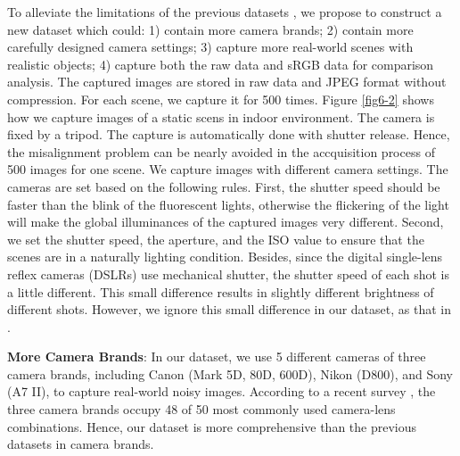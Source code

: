 To alleviate the limitations of the previous datasets \cite{RENOIR2014,crosschannel2016,dnd2017}, we propose to construct a new dataset which could: 1) contain more camera brands; 2) contain more carefully designed camera settings; 3) capture more real-world scenes with realistic objects; 4) capture both the raw data and sRGB data for comparison analysis. The captured images are stored in raw data and JPEG format without compression. For each scene, we capture it for 500 times. Figure \ref{fig6-2} shows how we capture images of a static scens in indoor environment. The camera is fixed by a tripod. The capture is automatically done with shutter release. Hence, the misalignment problem can be nearly avoided in the accquisition process of 500 images for one scene. We capture images with different camera settings. The cameras are set based on the following rules. First, the shutter speed should be faster than the blink of the fluorescent lights, otherwise the flickering of the light will make the global illuminances of the captured images very different. Second, we set the shutter speed, the aperture, and the ISO value to ensure that the scenes are in a naturally lighting condition. Besides, since the digital single-lens reflex cameras (DSLRs) use mechanical shutter, the shutter speed of each shot is a little different. This small difference results in slightly different brightness of different shots. However, we ignore this small difference in our dataset, as that in \cite{crosschannel2016}.


\textbf{More Camera Brands}: In our dataset, we use 5 different cameras of three camera brands, including Canon (Mark 5D, 80D, 600D), Nikon (D800), and Sony (A7 II), to capture real-world noisy images. According to a recent survey \cite{commoncamera}, the three camera brands occupy 48 of 50 most commonly used camera-lens combinations. Hence, our dataset is more comprehensive than the previous datasets in camera brands.



